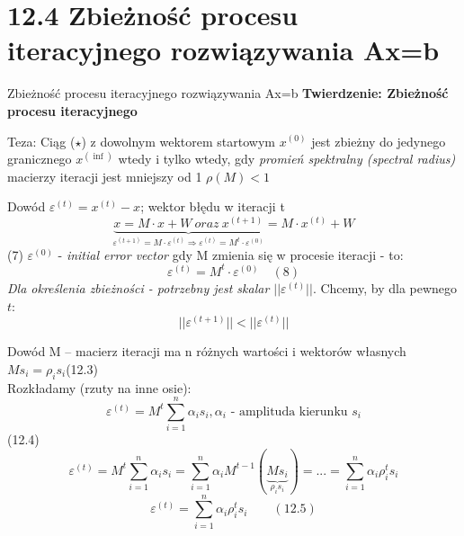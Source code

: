 \section{12.4 Zbieżność procesu iteracyjnego rozwiązywania Ax=b}

\begin{frame}{Zbieżność procesu iteracyjnego rozwiązywania Ax=b}
  \textbf{Twierdzenie: Zbieżność procesu iteracyjnego}
  \begin{block}{Teza:}
    \center Ciąg ($\star$) z dowolnym wektorem startowym $x^{(0)}$ jest zbieżny do jedynego granicznego $x^{(\inf)}$ wtedy i tylko wtedy, gdy \emph{promień spektralny (spectral radius)} macierzy iteracji jest mniejszy od 1
    \center $\rho(M)<1$
  \end{block}
\end{frame}

\begin{frame}{}
  \begin{block}{Dowód}
    $\varepsilon^{(t)}=x^{(t)}-x$; wektor błędu w iteracji t
    \[\underbrace{x=M \cdot x+W\ oraz\ x^{(t+1)}}_{\varepsilon^{(t+1)}=M \cdot \varepsilon^{(t)} \Rightarrow \varepsilon^{(t)}=M^t \cdot \varepsilon^{(0)}}=M \cdot x^{(t)}+W\]
    (7) $\varepsilon^{(0)}$ - \emph{initial error vector} gdy M zmienia się w procesie iteracji - to:
    \[{\varepsilon}^{(t)}=M^t \cdot {\varepsilon}^{(0)} \quad (8)\]
    \emph{Dla określenia zbieżności - potrzebny jest skalar $||\varepsilon^{(t)}||$}.
    Chcemy, by dla pewnego $t$:
    \[||\varepsilon^{(t+1)}||<||\varepsilon^{(t)}||\]
  \end{block}
\end{frame}

\begin{frame}{}
  \begin{block}{Dowód}
    M -- macierz iteracji ma n różnych wartości i wektorów własnych
    \\\hfill$Ms_i=\rho _is_i$\hfill (12.3)
    \newline
    \\Rozkładamy (rzuty na inne osie):
    \\\hfill\[\varepsilon^{(t)}=M^t \sum_{i = 1}^{n} \alpha _i s_i , \alpha _i \text{ - amplituda kierunku } s_i\]\hfill (12.4)
    \[\varepsilon^{(t)}=M^t \sum_{i = 1}^{n} \alpha _i s_i = \sum_{i = 1}^{n} \alpha _i M^{t-1}(\underbrace{Ms_i}_{\rho _i s_i}) = ... = \sum_{i = 1}^{n} \alpha _i \rho _i^t s_i \]
    \[\boxed{\varepsilon^{(t)}=\sum_{i = 1}^{n} \alpha _i \rho _i^t s_i} \qquad (12.5)\]
  \end{block}
\end{frame}

